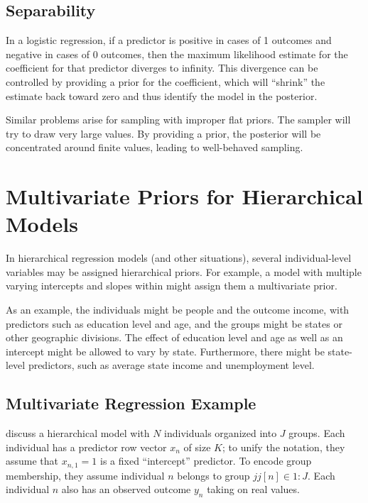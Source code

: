 \subsection{Separability}

In a logistic regression, if a predictor is positive in cases of 1
outcomes and negative in cases of 0 outcomes, then the maximum
likelihood estimate for the coefficient for that predictor diverges to
infinity.  This divergence can be controlled by providing a prior for
the coefficient, which will ``shrink'' the estimate back toward zero
and thus identify the model in the posterior.

Similar problems arise for sampling with improper flat priors.  The
sampler will try to draw very large values.  By providing a prior,
the posterior will be concentrated around finite values, leading to
well-behaved sampling.



\section{Multivariate Priors for Hierarchical Models}\label{multivariate-hierarchical-priors.section}

In hierarchical regression models (and other situations), several
individual-level variables may be assigned hierarchical priors.  For
example, a model with multiple varying intercepts and slopes within
might assign them a multivariate prior.

As an example, the individuals might be people and the outcome income,
with predictors such as education level and age, and the groups might be states
or other geographic divisions.  The effect of education level and age
as well as an intercept might be allowed to vary by state.
Furthermore, there might be state-level predictors, such as average
state income and unemployment level.

\subsection{Multivariate Regression Example}

\cite[Chapter 13, Chapter 17]{GelmanHill:2007} discuss a hierarchical
model with $N$ individuals organized into $J$ groups.  Each individual
has a predictor row vector $x_n$ of size $K$; to unify the notation, they
assume that $x_{n,1} = 1$ is a fixed ``intercept'' predictor.  To
encode group membership, they assume individual $n$ belongs to group
$jj[n] \in 1{:}J$.  Each individual $n$ also has an observed outcome
$y_n$ taking on real values.

